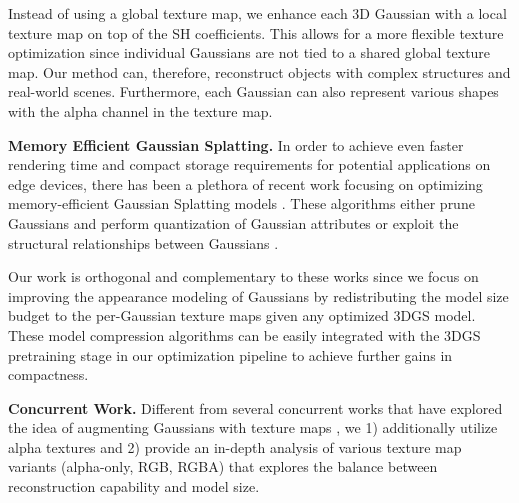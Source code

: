 Instead of using a global texture map, we enhance each 3D Gaussian with a local texture map on top of the SH coefficients. 
This allows for a more flexible texture optimization since individual Gaussians are not tied to a shared global texture map. 
Our method can, therefore, reconstruct objects with complex structures and real-world scenes. 
Furthermore, each Gaussian can also represent various shapes with the alpha channel in the texture map.

\noindent \textbf{Memory Efficient Gaussian Splatting. } 
In order to achieve even faster rendering time and compact storage requirements for potential applications on edge devices, there has been a plethora of recent work focusing on optimizing memory-efficient Gaussian Splatting models \cite{bagdasarian20243dgszipsurvey3dgaussian}. 
These algorithms either prune Gaussians and perform quantization of Gaussian attributes \cite{kerbl2024reducing, lee2024compact, navaneet2023compact3d, morgenstern2023compact, fan2023lightgaussian, Niedermayr_2024_CVPR} or exploit the structural relationships between Gaussians \cite{chen2024hash, tao2024scaffoldgs}. 

Our work is orthogonal and complementary to these works since we focus on improving the appearance modeling of Gaussians by redistributing the model size budget to the per-Gaussian texture maps given any optimized 3DGS model. 
These model compression algorithms can be easily integrated with the 3DGS pretraining stage in our optimization pipeline to achieve further gains in compactness.

\noindent \textbf{Concurrent Work.} Different from several concurrent works that have explored the idea of augmenting Gaussians with texture maps \cite{rong2024gstex, song2024hdgstextured2dgaussian, xu2024SuperGaussians, svitov2025billboardsplattingbbsplatlearnable}, we 1) additionally utilize alpha textures and 2) provide an in-depth analysis of various texture map variants (alpha-only, RGB, RGBA) that explores the balance between reconstruction capability and model size.
